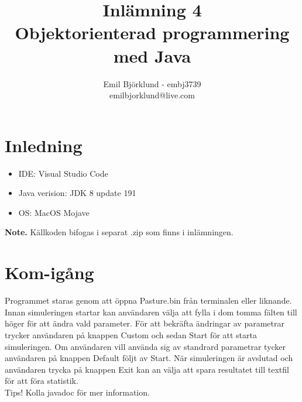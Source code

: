 \documentclass{article}
\title{Inlämning 4 \\ Objektorienterad programmering med Java}
\author{Emil Björklund - embj3739 \\ emilbjorklund@live.com}
\begin{document}
\maketitle 
\newpage

\section{Inledning}
\begin {itemize}
\item IDE: Visual Studio Code
\item Java verision: JDK 8 update 191
\item OS: MacOS Mojave
\end{itemize}

\textbf{Note.} Källkoden bifogas i separat .zip som finns i inlämningen.

\section{Kom-igång}
Programmet staras genom att öppna Pasture.bin från terminalen eller liknande.
Innan simuleringen startar kan användaren välja att fylla i dom tomma fälten till höger för att ändra vald parameter.
För att bekräfta ändringar av parametrar trycker användaren på knappen Custom och sedan Start för att starta simuleringen.
Om användaren vill använda sig av standrard parametrar tycker användaren på knappen Default följt av Start.
När simuleringen är avslutad och användaren trycka på knappen Exit kan an välja att spara resultatet till textfil för att föra statistik.
\\
Tips! Kolla javadoc för mer information.
\end{document}
